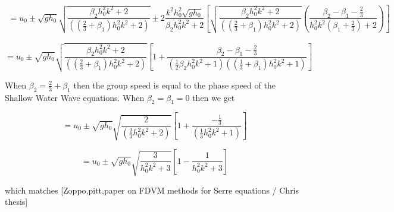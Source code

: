 \documentclass[10pt]{article}
\begin{document}
\begin{multline*}
= u_0  \pm  \sqrt{gh_0} \sqrt{\dfrac{\beta_2 h_0^2 k^2 + 2}{\left( \left(\frac{2}{3} + \beta_1\right) h_0^2 k^2 + 2\right)} } \pm  2\dfrac{k^2h_0^2\sqrt{gh_0}}{\beta_2 h_0^2 k^2 +2} \left[\sqrt{\dfrac{\beta_2 h_0^2 k^2 + 2}{\left( \left(\frac{2}{3} + \beta_1\right) h_0^2 k^2 + 2\right)} } \left(  \dfrac{\beta_2  -    \beta_1 - \frac{2}{3}}{h_0^2 k^2 \left(\beta_1 + \frac{2}{3}\right) + 2} \right)\right]
\end{multline*} 

\begin{equation*}
= u_0  \pm  \sqrt{gh_0} \sqrt{\dfrac{\beta_2 h_0^2 k^2 + 2}{\left( \left(\frac{2}{3} + \beta_1\right) h_0^2 k^2 + 2\right)} } \left[1 +  \dfrac{\beta_2 - \beta_1 - \frac{2}{3}}{\left(\frac{1}{2}\beta_2 h_0^2 k^2 +1\right)\left( \left(\frac{1}{3} + \beta_1\right) h_0^2 k^2 + 1\right)}\right] 
\end{equation*} 


When $\beta_2 = \frac{2}{3} + \beta_1$ then the group speed is equal to the phase speed of the Shallow Water Wave equations. When $\beta_2 = \beta_1 = 0$ then we get

\begin{equation*}
= u_0  \pm  \sqrt{gh_0} \sqrt{\dfrac{2}{\left( \frac{2}{3} h_0^2 k^2 + 2\right)} } \left[1 + \dfrac{- \frac{1}{3}}{\left( \frac{1}{3} h_0^2 k^2 + 1\right)}\right] 
\end{equation*} 

\begin{equation*}
= u_0  \pm  \sqrt{gh_0} \sqrt{\dfrac{3}{  h_0^2 k^2 + 3} } \left[1 -  \dfrac{1}{ h_0^2 k^2 + 3}\right] 
\end{equation*} 

which matches [Zoppo,pitt,paper on FDVM methods for Serre equations / Chris thesis]
\end{document}
